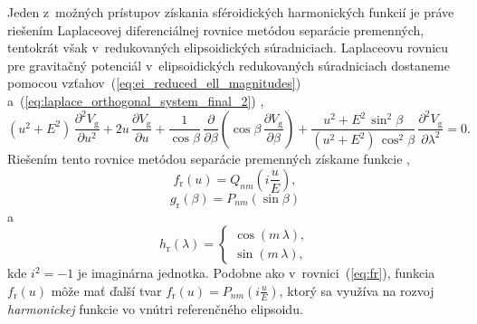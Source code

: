 \documentclass[a4paper,12pt]{book}
\newcommand{\gidx}{\mathrm g}
\begin{document}
Jeden z~možných prístupov získania sféroidických harmonických funkcií je práve 
riešením Laplaceovej diferenciálnej rovnice metódou separácie premenných, 
tentokrát však v~redukovaných elipsoidických súradniciach.  Laplaceovu rovnicu 
pre gravitačný potenciál v~elipsoidických redukovaných súradniciach dostaneme 
pomocou vzťahov~(\ref{eq:ei_reduced_ell_magnitudes}) 
a~(\ref{eq:laplace_orthogonal_system_final_2})
\parencite{MoritzPhysicalGeodesy},
%
\begin{equation}
\label{eq:vg_laplace_ellred} (u^2 + E^2) \, \frac{\partial^2 V_\gidx}{\partial u^2} + 2u \, \frac{\partial 
V_\gidx}{\partial u} + \frac{1}{\cos\beta} \, \frac{\partial}{\partial\beta} 
\left( \cos\beta \, \frac{\partial V_\gidx}{\partial\beta} \right) + \frac{u^2 
+ E^2 \, \sin^2\beta}{(u^2 + E^2) \, \cos^2\beta} \, \frac{\partial^2 
V_\gidx}{\partial \lambda^2} = 0{.}
\end{equation}
%
Riešením tento rovnice metódou separácie premenných získame funkcie 
\parencite{MoritzPhysicalGeodesy},
%
\begin{equation}
\label{eq:fu}
f_{\mathrm{r}}(u) =
Q_{nm}\left( i \dfrac{u}{E} \right){,}
\end{equation}
%
\begin{equation}
\label{eq:gr}
g_{\mathrm{r}}(\beta) = P_{nm}(\sin\beta)
\end{equation}
%
a
%
\begin{equation}
h_{\mathrm{r}}(\lambda) =
%
\begin{cases}
\cos(m\,\lambda){,}\\
\sin(m\,\lambda){,}
\end{cases}
\end{equation}
%
kde $i^2 = -1$ je imaginárna jednotka.  Podobne ako v~rovnici~(\ref{eq:fr}), 
funkcia~$f_{\mathrm{r}}(u)$ môže mať ďalší tvar $f_{\mathrm{r}}(u) 
= P_{nm}\left( i \frac{u}{E} \right)$, ktorý sa využíva na rozvoj 
\emph{harmonickej} funkcie vo vnútri referenčného elipsoidu.
\end{document}
